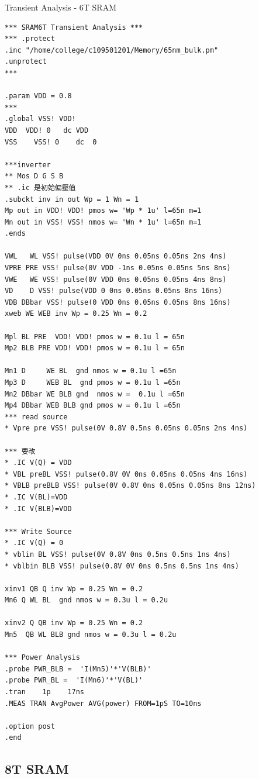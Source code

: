 \documentclass[a4paper]{article}
\newenvironment{code}{\captionsetup{type=listing, font=large, name=List.}}{}
\begin{document}
\begin{code}
\caption{Transient Analysis - 6T SRAM}
\begin{verbatim}
*** SRAM6T Transient Analysis ***
*** .protect
.inc "/home/college/c109501201/Memory/65nm_bulk.pm"
.unprotect
*** 

.param VDD = 0.8
***
.global VSS! VDD!
VDD  VDD! 0   dc VDD
VSS    VSS! 0    dc  0

***inverter
** Mos D G S B
** .ic 是初始偏壓值
.subckt inv in out Wp = 1 Wn = 1
Mp out in VDD! VDD! pmos w= 'Wp * 1u' l=65n m=1
Mn out in VSS! VSS! nmos w= 'Wn * 1u' l=65n m=1
.ends

VWL   WL VSS! pulse(VDD 0V 0ns 0.05ns 0.05ns 2ns 4ns)
VPRE PRE VSS! pulse(0V VDD -1ns 0.05ns 0.05ns 5ns 8ns)
VWE   WE VSS! pulse(0V VDD 0ns 0.05ns 0.05ns 4ns 8ns)
VD    D VSS! pulse(VDD 0 0ns 0.05ns 0.05ns 8ns 16ns)
VDB DBbar VSS! pulse(0 VDD 0ns 0.05ns 0.05ns 8ns 16ns)
xweb WE WEB inv Wp = 0.25 Wn = 0.2

Mpl BL PRE  VDD! VDD! pmos w = 0.1u l = 65n
Mp2 BLB PRE VDD! VDD! pmos w = 0.1u l = 65n

Mn1 D     WE BL  gnd nmos w = 0.1u l =65n
Mp3 D     WEB BL  gnd pmos w = 0.1u l =65n
Mn2 DBbar WE BLB gnd  nmos w =  0.1u l =65n
Mp4 DBbar WEB BLB gnd pmos w = 0.1u l =65n
*** read source
* Vpre pre VSS! pulse(0V 0.8V 0.5ns 0.05ns 0.05ns 2ns 4ns)

*** 要改
* .IC V(Q) = VDD
* VBL preBL VSS! pulse(0.8V 0V 0ns 0.05ns 0.05ns 4ns 16ns)
* VBLB preBLB VSS! pulse(0V 0.8V 0ns 0.05ns 0.05ns 8ns 12ns)
* .IC V(BL)=VDD
* .IC V(BLB)=VDD

*** Write Source
* .IC V(Q) = 0
* vblin BL VSS! pulse(0V 0.8V 0ns 0.5ns 0.5ns 1ns 4ns)
* vblbin BLB VSS! pulse(0.8V 0V 0ns 0.5ns 0.5ns 1ns 4ns)

xinv1 QB Q inv Wp = 0.25 Wn = 0.2
Mn6 Q WL BL  gnd nmos w = 0.3u l = 0.2u

xinv2 Q QB inv Wp = 0.25 Wn = 0.2
Mn5  QB WL BLB gnd nmos w = 0.3u l = 0.2u

*** Power Analysis
.probe PWR_BLB =  'I(Mn5)'*'V(BLB)'
.probe PWR_BL =  'I(Mn6)'*'V(BL)'
.tran    1p    17ns 
.MEAS TRAN AvgPower AVG(power) FROM=1pS TO=10ns

.option post
.end  
\end{verbatim}
\end{code}

\subsection{8T SRAM}
\end{document}
